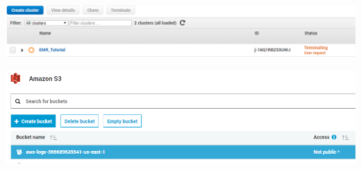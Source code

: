 \centering\includegraphics[width=\columnwidth]{../images/emr_terminate.png}

\centering\includegraphics[width=\columnwidth]{../images/s3_delete_bucket.png}


 

